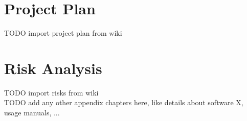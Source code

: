 \documentclass[a4paper]{report}
\begin{document}
\section{Project Plan}
TODO import project plan from wiki\\

\section{Risk Analysis}
TODO import risks from wiki\\



TODO add any other appendix chapters here, like details about software X, usage manuals, ...\\
\end{document}
